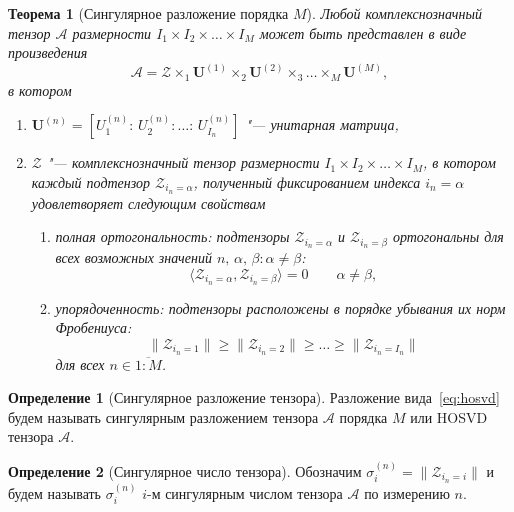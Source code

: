 \documentclass[specialist,
    substylefile = spbu_report.rtx,
    subf,href,colorlinks=true, 12pt]{disser}
\theoremstyle{plain}
\newtheorem{theorem}{Теорема}
\theoremstyle{definition}
\newtheorem{definition}{Определение}[section]
\theoremstyle{remark}
\begin{document}
    \begin{theorem}
    [Сингулярное разложение порядка $M$]
        Любой комплекснозначный тензор $\mathcal{A}$ размерности $I_1\times I_2 \times \ldots \times I_M$ может быть представлен
        в виде произведения
        \begin{equation}
            \mathcal{A} = \mathcal{Z} \times_1 \mathbf{U}^{(1)} \times_2 \mathbf{U}^{(2)} \times_3 \ldots \times_M \mathbf{U}^{(M)},\label{eq:hosvd}
        \end{equation}
        в котором
        \begin{enumerate}
            \item $\mathbf{U}^{(n)}=\left[U_1^{(n)}:\, U_2^{(n)}:\ldots:\, U_{I_n}^{(n)} \right]$ "--- унитарная матрица,
            \item $\mathcal{Z}$ "--- комплекснозначный тензор размерности $I_1\times I_2 \times \ldots \times I_M$, в котором
            каждый подтензор $\mathcal Z_{i_n=\alpha}$, полученный фиксированием индекса $i_n=\alpha$ удовлетворяет следующим свойствам
            \begin{enumerate}
                \item полная ортогональность: подтензоры $\mathcal Z_{i_n=\alpha}$ и $\mathcal Z_{i_n=\beta}$ ортогональны для всех возможных значений
                $n,\, \alpha,\, \beta: \alpha\ne\beta$:
                \[
                    \langle\mathcal Z_{i_n=\alpha},\mathcal Z_{i_n=\beta}\rangle=0 \qquad \alpha\ne\beta,
                \]
                \item упорядоченность: подтензоры расположены в порядке убывания их норм Фробениуса:
                \begin{equation}
                    \|\mathcal Z_{i_n=1}\|\geqslant\|\mathcal Z_{i_n=2}\| \geqslant \ldots \geqslant\|\mathcal Z_{i_n=I_n}\|\label{eq:order}
                \end{equation}
                для всех $n\in \overline{1:M}$.
            \end{enumerate}
        \end{enumerate}
    \end{theorem}
    \begin{definition}[Сингулярное разложение тензора]
        \label{def:hosvd}
        Разложение вида~\eqref{eq:hosvd} будем называть сингулярным разложением тензора $\mathcal{A}$ порядка $M$ или
        HOSVD тензора $\mathcal{A}$.
    \end{definition}
    \begin{definition}[Сингулярное число тензора]
        \label{def:singular-value}
        Обозначим $\sigma_i^{(n)}=\|\mathcal Z_{i_n=i}\|$ и будем называть $\sigma_i^{(n)}$ $i$-м сингулярным числом
        тензора $\mathcal A$ по измерению $n$.
    \end{definition}
\end{document}

